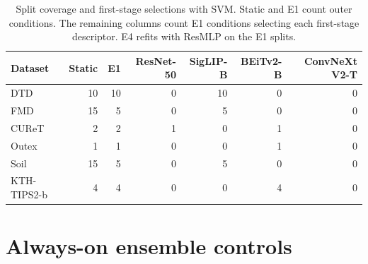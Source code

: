 \documentclass[10pt,a4paper,fleqn]{article}
\begin{document}
\begin{table}[htbp]
\centering
\caption{Split coverage and first-stage selections with SVM. Static and E1 count outer conditions. The remaining columns count E1 conditions selecting each first-stage descriptor. E4 refits with ResMLP on the E1 splits.}
\label{tab:e1-routes}
\begin{tabular}{@{}lrrrrrr@{}}
\toprule
Dataset & Static & E1 & ResNet-50 & SigLIP-B & BEiTv2-B & ConvNeXt V2-T \\
\midrule
DTD & 10 & 10 & 0 & 10 & 0 & 0 \\
FMD & 15 & 5 & 0 & 5 & 0 & 0 \\
CUReT & 2 & 2 & 1 & 0 & 1 & 0 \\
Outex & 1 & 1 & 0 & 0 & 1 & 0 \\
Soil & 15 & 5 & 0 & 5 & 0 & 0 \\
KTH-TIPS2-b & 4 & 4 & 0 & 0 & 4 & 0 \\
\bottomrule
\end{tabular}
\end{table}

\FloatBarrier

\section{Always-on ensemble controls}
\end{document}
